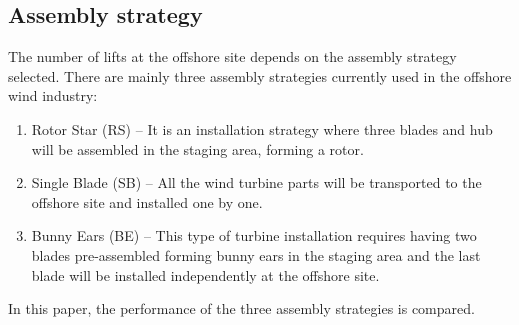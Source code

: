 \subsection{Assembly strategy}
The number of lifts at the offshore site depends on the assembly strategy selected. There are mainly three assembly strategies currently used in the offshore wind industry:

\begin{enumerate}
\item Rotor Star (RS) -- It is an installation strategy where three blades and hub will be assembled in the staging area, forming a rotor.
\item Single Blade (SB) -- All the wind turbine parts will be transported to the offshore site and installed one by one.
\item Bunny Ears (BE) -- This type of turbine installation requires having two blades pre-assembled forming bunny ears in the staging area and the last blade will be installed independently at the offshore site.
\end{enumerate}

In this paper, the performance of the three assembly strategies is compared.
